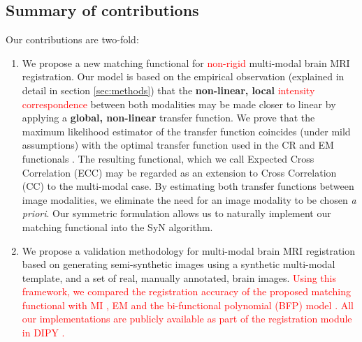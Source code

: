 \subsection{Summary of contributions}
Our contributions are two-fold:
\begin{enumerate}
\item{We propose a new matching functional for \textcolor{red}{non-rigid} multi-modal brain MRI registration. Our model is based on the empirical observation (explained in detail in section \ref{sec:methods}) that the \textbf{non-linear, local} \textcolor{red}{intensity correspondence} between both modalities may be made closer to linear by applying a \textbf{global, non-linear} transfer function. We prove that the maximum likelihood estimator of the transfer function coincides (under mild assumptions) with the optimal transfer function used in the CR and EM functionals \cite{Roche1998, Arce-santana2014, Ocegueda2015}. The resulting functional, which we call Expected Cross Correlation (ECC) may be regarded as an extension to Cross Correlation (CC) to the multi-modal case. By estimating both transfer functions between image modalities, we eliminate the need for an image modality to be chosen {\it a priori}. Our symmetric formulation allows us to naturally implement our matching functional into the SyN \cite{Avants2011a} algorithm.}
\item{We propose a validation methodology for multi-modal brain MRI registration based on generating semi-synthetic images using a synthetic multi-modal template, and a set of real, manually annotated, brain images. \textcolor{red}{ Using this framework, we compared the registration accuracy of the proposed matching functional with MI \cite{Mattes2003}, EM \cite{Arce-santana2014} and the bi-functional polynomial (BFP) model \cite{Guimond2001}. All our implementations are publicly available as part of the registration module in DIPY \cite{Garyfallidis2014}.}}
\end{enumerate}
